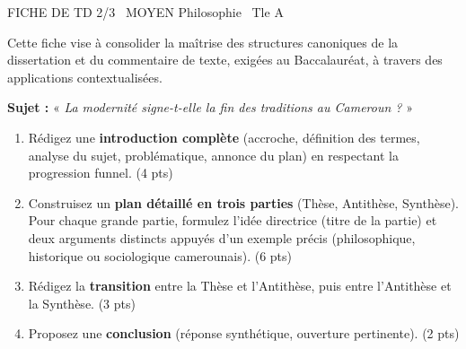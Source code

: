 \documentclass[11pt]{article}
\begin{document}
\begin{tcolorbox}[enhanced,colback=popink,colframe=popink,arc=10pt,boxrule=0pt,left=12pt,right=12pt,top=9pt,bottom=9pt]
{\color{white}\popxbold\small FICHE DE TD 2/3 \textbullet\ MOYEN \hfill Philosophie \textbullet\ Tle A\par}
\end{tcolorbox}
\vspace{4pt}
\noindent Cette fiche vise à consolider la maîtrise des structures canoniques de la dissertation et du commentaire de texte, exigées au Baccalauréat, à travers des applications contextualisées.

\begin{exercice}
\textbf{Sujet :} « \textit{La modernité signe-t-elle la fin des traditions au Cameroun ?} »
\begin{enumerate}
    \item Rédigez une \textbf{introduction complète} (accroche, définition des termes, analyse du sujet, problématique, annonce du plan) en respectant la progression funnel. \hfill (4 pts)
    \item Construisez un \textbf{plan détaillé en trois parties} (Thèse, Antithèse, Synthèse). Pour chaque grande partie, formulez l'idée directrice (titre de la partie) et deux arguments distincts appuyés d'un exemple précis (philosophique, historique ou sociologique camerounais). \hfill (6 pts)
    \item Rédigez la \textbf{transition} entre la Thèse et l'Antithèse, puis entre l'Antithèse et la Synthèse. \hfill (3 pts)
    \item Proposez une \textbf{conclusion} (réponse synthétique, ouverture pertinente). \hfill (2 pts)
\end{enumerate}
\end{exercice}
\end{document}
